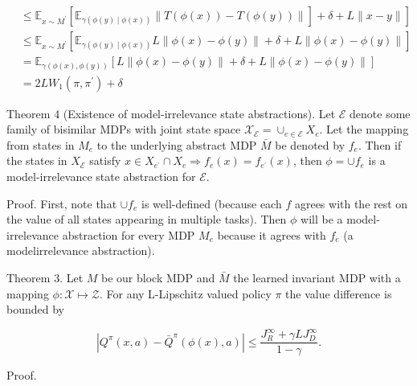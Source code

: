 \documentclass[10pt]{article}
\begin{document}
\[
\begin{aligned}
& \left.\leq \mathbb{E}_{x \sim M^{\prime}}\left[\mathbb{E}_{\gamma(\phi(y) \mid \phi(x))}\|T(\phi(x))-T(\phi(y))\|\right]+\delta+L\|x-y\|\right] \\
& \leq \mathbb{E}_{x \sim M^{\prime}}\left[\mathbb{E}_{\gamma(\phi(y) \mid \phi(x))} L\|\phi(x)-\phi(y)\|+\delta+L\|\phi(x)-\phi(y)\|\right] \\
& =\mathbb{E}_{\gamma(\phi(x), \phi(y))}[L\|\phi(x)-\phi(y)\|+\delta+L\|\phi(x)-\phi(y)\|] \\
& =2 L W_{1}\left(\pi, \pi^{\prime}\right)+\delta
\end{aligned}
\]

Theorem 4 (Existence of model-irrelevance state abstractions). Let $\mathcal{E}$ denote some family of bisimilar MDPs with joint state space $\mathcal{X}_{\mathcal{E}}=\cup_{e \in \mathcal{E}} X_{e}$. Let the mapping from states in $M_{e}$ to the underlying abstract MDP $\bar{M}$ be denoted by $f_{e}$. Then if the states in $X_{\mathcal{E}}$ satisfy $x \in X_{e^{\prime}} \cap X_{e} \Longrightarrow f_{e}(x)=f_{e^{\prime}}(x)$, then $\phi=\cup f_{e}$ is a model-irrelevance state abstraction for $\mathcal{E}$.

Proof. First, note that $\cup f_{e}$ is well-defined (because each $f$ agrees with the rest on the value of all states appearing in multiple tasks). Then $\phi$ will be a model-irrelevance abstraction for every MDP $M_{e}$ because it agrees with $f_{e}$ (a modelirrelevance abstraction).

Theorem 3. Let $M$ be our block MDP and $\bar{M}$ the learned invariant MDP with a mapping $\phi: \mathcal{X} \mapsto \mathcal{Z}$. For any L-Lipschitz valued policy $\pi$ the value difference is bounded by

\[
\left|Q^{\pi}(x, a)-\bar{Q}^{\pi}(\phi(x), a)\right| \leq \frac{J_{R}^{\infty}+\gamma L J_{D}^{\infty}}{1-\gamma} .
\]

Proof.
\end{document}
